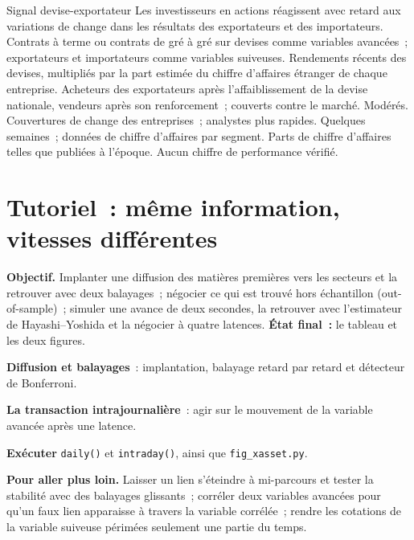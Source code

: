 \begin{strategyfile}{Signal devise-exportateur}\label{strat:s1:cross-asset-lead-lag:currency}
 Les investisseurs en actions réagissent avec retard aux variations de change dans les résultats des exportateurs et des importateurs.
 Contrats à terme ou contrats de gré à gré sur devises comme variables avancées~; exportateurs et importateurs comme variables suiveuses.
 Rendements récents des devises, multipliés par la part estimée du chiffre d'affaires étranger de chaque entreprise.
 Acheteurs des exportateurs après l'affaiblissement de la devise nationale, vendeurs après son renforcement~; couverts contre le marché.
 Modérés.
 Couvertures de change des entreprises~; analystes plus rapides.
 Quelques semaines~; données de chiffre d'affaires par segment.
 Parts de chiffre d'affaires telles que publiées à l'époque.
 Aucun chiffre de performance vérifié.
\end{strategyfile}

\section{Tutoriel~: même information, vitesses différentes}\label{tut:s1:cross-asset-lead-lag:tut}

\begin{tutorial}
\textbf{Objectif.} Implanter une diffusion des matières premières vers les secteurs et la retrouver avec deux balayages~; négocier ce qui est trouvé hors échantillon (out-of-sample)~; simuler une avance de deux secondes,
la retrouver avec l'estimateur de Hayashi--Yoshida et la négocier à quatre latences. \textbf{État final~:} le tableau et les deux figures.
\begin{tutsteps}
\item \textbf{Diffusion et balayages}~: implantation, balayage retard par retard et détecteur de Bonferroni.
\label{lst:s1:cross-asset-lead-lag:scan}
\item \textbf{La transaction intrajournalière}~: agir sur le mouvement de la variable avancée après une latence.
\label{lst:s1:cross-asset-lead-lag:trades}
\item \textbf{Exécuter} \texttt{daily()} et \texttt{intraday()}, ainsi que \texttt{fig\_xasset.py}.
\end{tutsteps}
\textbf{Pour aller plus loin.} Laisser un lien s'éteindre à mi-parcours et tester la stabilité avec des balayages glissants~; corréler deux variables avancées pour qu'un faux lien apparaisse
à travers la variable corrélée~; rendre les cotations de la variable suiveuse périmées seulement une partie du temps.
\end{tutorial}

